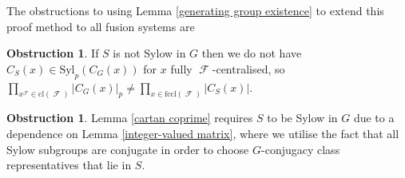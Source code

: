 \documentclass[12pt]{article}
\DeclareMathOperator{\sF}{\mathcal{F}}
\theoremstyle{plain}
\theoremstyle{definition}
\newcounter{Obs}
\newtheorem{obs}[thm]{Obstruction}
\begin{document}
The obstructions to using Lemma \ref{generating group existence} to extend this proof method to all fusion systems are

\begin{obs}\label{obs1} If $S$ is not Sylow in $G$ then we do not have $C_S(x) \in \text{Syl}_p(C_G(x))$ for $x$ fully $\sF$-centralised, so $\prod_{x^{\sF} \in \text{cl}(\sF)} |C_G(x)|_p \neq \prod_{x \in \text{fccl}(\sF)} |C_S(x)|$. \end{obs}
\begin{obs}\label{obs2}
Lemma \ref{cartan coprime} requires $S$ to be Sylow in $G$ due to a dependence on Lemma \ref{integer-valued matrix}, where we utilise the fact that all Sylow subgroups are conjugate in order to choose $G$-conjugacy class representatives that lie in $S$.
\end{obs}
\end{document}
